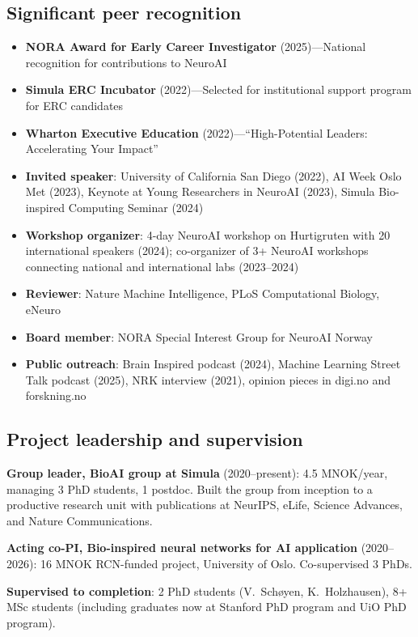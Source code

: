 \subsection*{Significant peer recognition}

\begin{itemize}[noitemsep,topsep=2pt]
  \item \textbf{NORA Award for Early Career Investigator} (2025)---National recognition for contributions to NeuroAI
  \item \textbf{Simula ERC Incubator} (2022)---Selected for institutional support program for ERC candidates
  \item \textbf{Wharton Executive Education} (2022)---``High-Potential Leaders: Accelerating Your Impact''
  \item \textbf{Invited speaker}: University of California San Diego (2022), AI Week Oslo Met (2023), Keynote at Young Researchers in NeuroAI (2023), Simula Bio-inspired Computing Seminar (2024)
  \item \textbf{Workshop organizer}: 4-day NeuroAI workshop on Hurtigruten with 20 international speakers (2024); co-organizer of 3+ NeuroAI workshops connecting national and international labs (2023--2024)
  \item \textbf{Reviewer}: Nature Machine Intelligence, PLoS Computational Biology, eNeuro
  \item \textbf{Board member}: NORA Special Interest Group for NeuroAI Norway
  \item \textbf{Public outreach}: Brain Inspired podcast (2024), Machine Learning Street Talk podcast (2025), NRK interview (2021), opinion pieces in digi.no and forskning.no
\end{itemize}

\subsection*{Project leadership and supervision}

\noindent\textbf{Group leader, BioAI group at Simula} (2020--present): 4.5 MNOK/year, managing 3 PhD students, 1 postdoc. Built the group from inception to a productive research unit with publications at NeurIPS, eLife, Science Advances, and Nature Communications.

\noindent\textbf{Acting co-PI, Bio-inspired neural networks for AI application} (2020--2026): 16 MNOK RCN-funded project, University of Oslo. Co-supervised 3 PhDs.

\noindent\textbf{Supervised to completion}: 2 PhD students (V.\ Schøyen, K.\ Holzhausen), 8+ MSc students (including graduates now at Stanford PhD program and UiO PhD program).

